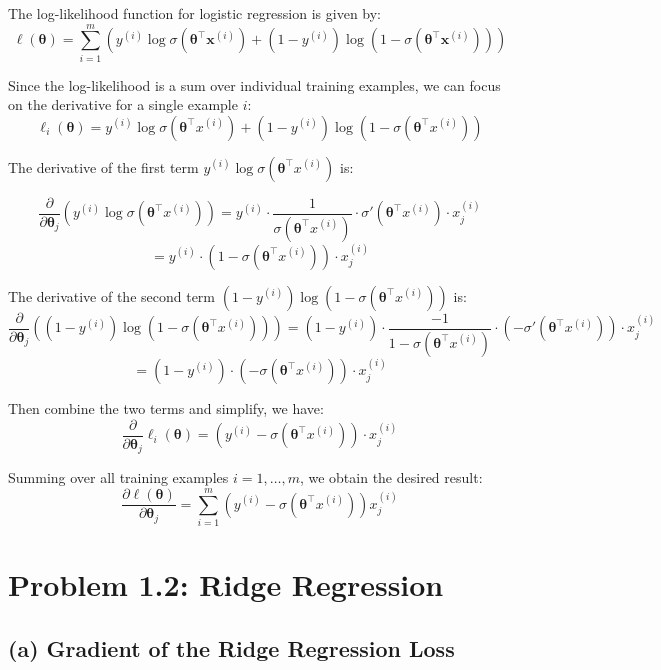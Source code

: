 \documentclass[12pt]{article}
\begin{document}
The log-likelihood function for logistic regression is given by:
\[
    \ell(\boldsymbol{\theta}) = \sum_{i=1}^{m} \left( y^{(i)} \log \sigma(\boldsymbol{\theta}^\top \boldsymbol{x}^{(i)}) + (1 - y^{(i)}) \log(1 - \sigma(\boldsymbol{\theta}^\top \boldsymbol{x}^{(i)})) \right)
\]

Since the log-likelihood is a sum over individual training examples, we can focus on the derivative for a single example \(i\):
\[
    \ell_i(\boldsymbol\theta) = y^{(i)} \log \sigma(\boldsymbol\theta^\top x^{(i)}) + (1 - y^{(i)}) \log(1 - \sigma(\boldsymbol\theta^\top x^{(i)}))
\]

The derivative of the first term \(y^{(i)} \log \sigma(\boldsymbol\theta^\top x^{(i)})\) is:


\[
    \frac{\partial}{\partial \boldsymbol\theta_j} \left( y^{(i)} \log \sigma(\boldsymbol\theta^\top x^{(i)}) \right)
    = y^{(i)} \cdot \frac{1}{\sigma(\boldsymbol\theta^\top x^{(i)})} \cdot \sigma'(\boldsymbol\theta^\top x^{(i)}) \cdot x_j^{(i)}
\]
\[
    = y^{(i)} \cdot (1 - \sigma(\boldsymbol\theta^\top x^{(i)})) \cdot x_j^{(i)}
\]

The derivative of the second term \((1 - y^{(i)}) \log(1 - \sigma(\boldsymbol\theta^\top x^{(i)}))\) is:
\[
\frac{\partial}{\partial \boldsymbol\theta_j} \left( (1 - y^{(i)}) \log(1 - \sigma(\boldsymbol\theta^\top x^{(i)})) \right)
= (1 - y^{(i)}) \cdot \frac{-1}{1 - \sigma(\boldsymbol\theta^\top x^{(i)})} \cdot (-\sigma'(\boldsymbol\theta^\top x^{(i)})) \cdot x_j^{(i)}
\]
\[
    = (1 - y^{(i)}) \cdot (- \sigma(\boldsymbol\theta^\top x^{(i)})) \cdot x_j^{(i)}
\]

Then combine the two terms and simplify, we have:
\[
    \frac{\partial}{\partial \boldsymbol\theta_j}\ell_i(\boldsymbol\theta) = (y^{(i)} - \sigma(\boldsymbol\theta^\top x^{(i)})) \cdot x_j^{(i)}
\]

Summing over all training examples \(i = 1, \ldots, m\), we obtain the desired result:
\[
\frac{\partial \ell(\boldsymbol\theta)}{\partial \boldsymbol\theta_j} = \sum_{i=1}^{m} \left( y^{(i)} - \sigma(\boldsymbol\theta^\top x^{(i)}) \right) x_j^{(i)}
\]

\section*{Problem 1.2: Ridge Regression}

\subsection*{(a) Gradient of the Ridge Regression Loss}
\end{document}
